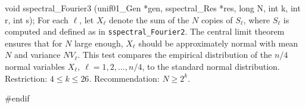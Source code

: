 void sspectral_Fourier3 (unif01_Gen *gen, sspectral_Res *res,
                         long N, int k, int r, int s);
\endcode
\tab
  For each $\ell$, let $X_\ell$ denote the sum of the $N$ copies of $S_\ell$,
  where $S_\ell$ is computed and defined as in {\tt sspectral\_Fourier2}.
  The central limit theorem ensures that for $N$ large enough, 
  $X_\ell$ should be approximately normal with mean  %
  $N$ and variance $NV_\ell$. This test compares the empirical
  distribution of the $n/4$ normal variables $X_\ell, \ \ell = 1, 2, \ldots,
  n/4$, to the standard normal distribution.
  Restriction: $4 \le k \le 26$. Recommendation: $N \ge 2^k$.
\endtab
\code

\hide
#endif
\endhide
\endcode
